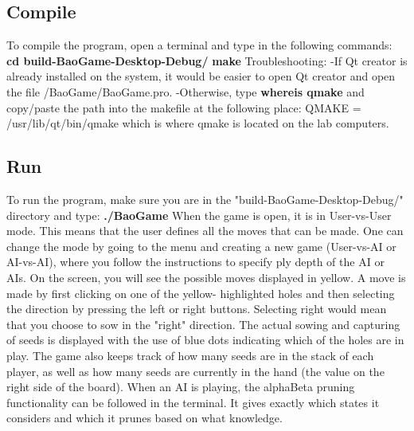 \documentclass[a4paper]{article}
\begin{document}
	\subsection{Compile}
	To compile the program, open a terminal and type in the following commands:
	\newline
	\newline
	\textbf{cd build-BaoGame-Desktop-Debug/} \newline
	\textbf{make} 
	\newline
	\newline
	Troubleshooting:\newline
	-If Qt creator is already installed on the system, it would be easier
		to open Qt creator and open the file /BaoGame/BaoGame.pro.
	-Otherwise, type 
	\newline
	\newline
	\textbf{whereis qmake}
	\newline
	\newline
	and copy/paste the path into the makefile at the following place:\newline
	\newline
	QMAKE = /usr/lib/qt/bin/qmake \newline
	\newline	
	which is where qmake is located on the lab computers.
	
	\subsection{Run}
	To run the program, make sure you are in the "build-BaoGame-Desktop-Debug/" directory
	and type: \newline
	\newline	
	\textbf{./BaoGame}
	\newline	
	\newline
	When the game is open, it is in User-vs-User mode. This means that the user defines all the moves that can be made. One can 		change the mode by going to the menu and creating a new game (User-vs-AI or AI-vs-AI), where you follow the instructions to 		specify ply depth of the AI or AIs.	
	\newline	
	\newline
	On the 	screen, you will see the possible moves displayed in yellow. A move is made by first clicking on one of the yellow-			highlighted holes and then selecting the direction by pressing the left or right buttons. Selecting right would mean that 			you choose to sow in the "right" direction. The actual sowing and capturing of seeds is displayed with the use of blue dots 		indicating which of the holes are in play.
	\newline	
	\newline
	The game also keeps track of how many seeds are in the stack of each player, as well as how many seeds are currently in the 			hand (the value on the right side of the board).
	\newline	
	\newline
	When an AI is playing, the alphaBeta pruning functionality can be followed in the terminal. It gives exactly which states it 	considers and which it prunes based on what knowledge.
	
\end{document}

